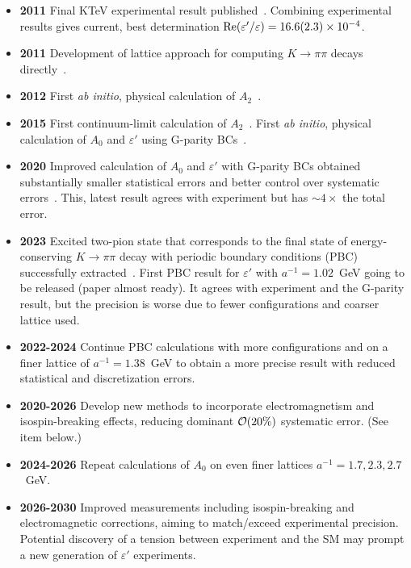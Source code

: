 \documentclass[12pt,hyperpdf]{article}
\begin{document}
\begin{itemize}
\begin{itemize}
    \item{\bf 2011} Final KTeV experimental result published~\cite{KTeV:2010sng}. Combining experimental results gives current, best determination ${\rm Re}(\varepsilon'/\varepsilon)=16.6(2.3)\times 10^{-4}$.
    \item{\bf 2011} Development of lattice approach for computing $K\to\pi\pi$ decays directly~\cite{Blum:2011pu}.
    \item{\bf 2012} First {\it ab initio}, physical calculation of $A_2$~\cite{Blum:2011ng,Blum:2012uk}.
    \item{\bf 2015} First continuum-limit calculation of $A_2$~\cite{Blum:2015ywa}. First {\it ab initio}, physical calculation of $A_0$ and $\varepsilon'$ using G-parity BCs~\cite{RBC:2015gro}.
    \item{\bf 2020} Improved calculation of $A_0$ and $\varepsilon'$ with G-parity BCs obtained substantially smaller statistical errors and better control over systematic errors~\cite{RBC:2020kdj}. This, latest result agrees with experiment but has ${\sim}4\times$ the total error.
    \item{\bf 2023} Excited two-pion state that corresponds to the final state of energy-conserving $K\to\pi\pi$ decay with periodic boundary conditions (PBC) successfully extracted~\cite{RBC:2023xqv}.  First PBC result for $\varepsilon'$ with $a^{-1}=1.02$~GeV going to be released (paper almost ready).  It agrees with experiment and the G-parity result, but the precision is worse due to fewer configurations and coarser lattice used.
    \item{\bf 2022-2024} Continue PBC calculations with more configurations and on a finer lattice of $a^{-1}=1.38$~GeV to obtain a more precise result with reduced statistical and discretization errors.
    \item{\bf 2020-2026} Develop new methods to incorporate electromagnetism and isospin-breaking effects, reducing dominant ${\cal O}(20\%)$ systematic error.  (See item below.)
    \item{\bf 2024-2026} Repeat calculations of $A_0$ on even finer lattices $a^{-1}=1.7, 2.3, 2.7$~GeV. 
    \item{\bf 2026-2030} Improved measurements including isospin-breaking and electromagnetic corrections, aiming to match/exceed experimental precision. Potential discovery of a tension between experiment and the SM may prompt a new generation of $\varepsilon'$ experiments. 
\end{itemize}
\end{itemize}
\end{document}
